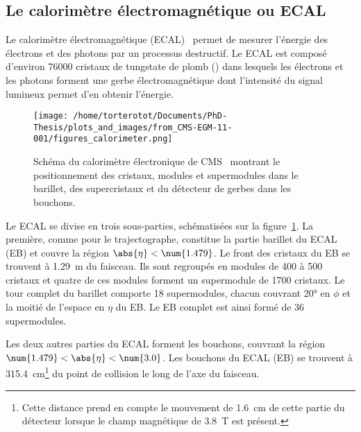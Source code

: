 \subsection{Le calorimètre électromagnétique ou ECAL}\label{chapter-LHC-section-CMS-subsec-ECAL}
Le calorimètre électromagnétique (ECAL)~\cite{cms_paper,CERN-LHCC-97-033,CMS-EGM-11-001,CMS-DP-2019-005,CMS-DP-2020-021} permet de mesurer l'énergie des électrons et des photons par un processus destructif.
Le ECAL est composé d'environ \num{76000} cristaux de tungstate de plomb () dans lesquels les électrons et les photons forment une gerbe électromagnétique dont l'intensité du signal lumineux permet d'en obtenir l'énergie.
\begin{figure}[h]
\centering
\texttt{[image: /home/torterotot/Documents/PhD-Thesis/plots\_and\_images/from\_CMS-EGM-11-001/figures\_calorimeter.png]}
\caption[Schéma du calorimètre électronique de CMS.]{Schéma du calorimètre électronique de CMS~\cite{cms_paper,CMS-EGM-11-001} montrant le positionnement des cristaux, modules et supermodules dans le barillet, des supercristaux et du détecteur de gerbes dans les bouchons.}
\label{fig-chapter-LHC-section-CMS-subsec-ECAL-CMS-EGM-11-001-figures_calorimeter}
\end{figure}
\par Le ECAL se divise en trois sous-parties, schématisées sur la figure~\ref{fig-chapter-LHC-section-CMS-subsec-ECAL-CMS-EGM-11-001-figures_calorimeter}.
La première, comme pour le trajectographe, constitue la partie barillet du ECAL (EB) et couvre la région $\abs{\eta}<\num{1.479}$.
Le front des cristaux du EB se trouvent à \SI{1.29}{\meter} du faisceau.
Ils sont regroupés en \og modules \fg{} de \num{400} à \num{500} cristaux et quatre de ces modules forment un \og supermodule \fg{} de \num{1700} cristaux.
Le tour complet du barillet comporte \num{18} supermodules, chacun couvrant \ang{20} en $\phi$ et la moitié de l'espace en $\eta$ du EB.
Le EB complet est ainsi formé de \num{36} supermodules.
\par Les deux autres parties du ECAL forment les bouchons, couvrant la région $\num{1.479}<\abs{\eta}<\num{3.0}$.
Les bouchons du ECAL (EB) se trouvent à \SI{315.4}{\centi\meter}\footnote{Cette distance prend en compte le mouvement de \SI{1.6}{\centi\meter} de cette partie du détecteur lorsque le champ magnétique de \SI{3.8}{\tesla} est présent.} du point de collision le long de l'axe du faisceau.
